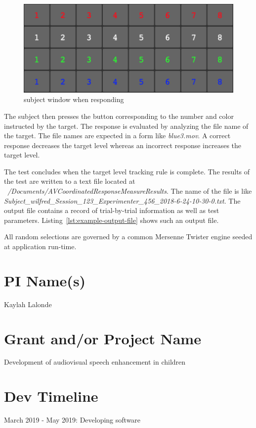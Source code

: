 \documentclass[11pt,pdftex,letterpaper]{article}
\begin{document}
\begin{figure}
\centering
\includegraphics[width = 0.9\linewidth]{subject-response-window.png}
\caption{subject window when responding}
\label{fig:subject-response-window}
\end{figure}
The subject then presses the button corresponding to the number and color instructed by the target. The response is evaluated by analyzing the file name of the target. The file names are expected in a form like \textit{blue3.mov}. A correct response decreases the target level whereas an incorrect response increases the target level.

The test concludes when the target level tracking rule is complete. The results of the test are written to a text file located at \textit{~/Documents/AVCoordinatedResponseMeasureResults}. The name of the file is like \textit{Subject\_wilfred\_Session\_123\_Experimenter\_456\_2018-6-24-10-30-0.txt}. The output file contains a record of trial-by-trial information as well as test parameters. Listing~\ref{lst:example-output-file} shows such an output file.


All random selections are governed by a common Mersenne Twister engine seeded at application run-time.

\section{PI Name(s)}
Kaylah Lalonde

\section{Grant and/or Project Name}
Development of audiovisual speech enhancement in children

\section{Dev Timeline}
March 2019 - May 2019: Developing software
\end{document}
